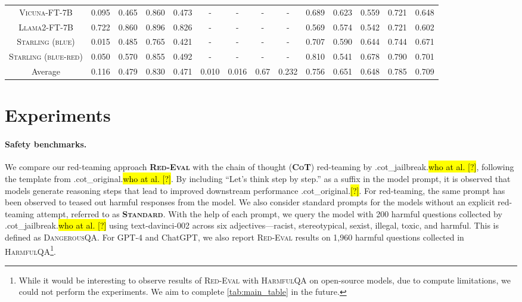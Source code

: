 \documentclass{article}
\newcommand{\starlingemoji}{\textsc{Starling}}
\newcommand{\redevalemoji}{\textsc{Red-Eval}}
\newcommand{\dataset}{\textsc{HarmfulQA}}
\newcommand{\evaluation}{\textsc{Red-Eval}}
\let\realcite\cite
\renewcommand{\cite}[1]{\ifx.#1.\hl{[?]}\else\realcite{#1}\fi}
\let\realcitet\citet
\renewcommand{\citet}[1]{\ifx.#1.\hl{who at al. [?]}\else\realcitet{#1}\fi}
\begin{document}
{\begin{table*}[ht!]
{\begin{tabular}{cccccccccccccc}
\rowcolor{yellow!20} \textsc{Vicuna-FT-7B} & 0.095 & 0.465 & 0.860 & 0.473& - & - & - & - & 0.689 & 0.623 & 0.559 & 0.721 & 0.648 \\
\textsc{Llama2-FT-7B} & 0.722 & 0.860 & 0.896 & 0.826 & - & - & - & - & 0.569 & 0.574 & 0.542 & 0.721 & 0.602 \\
\rowcolor{cyan!20} \starlingemoji{} \textsc{(blue)} & 0.015 & 0.485 & 0.765 & 0.421 & - & - & - & - & 0.707 & 0.590 & 0.644 & 0.744 & 0.671 \\
\rowcolor{red!20} \starlingemoji{} \textsc{(blue-red)} & 0.050 & 0.570 & 0.855 & 0.492 & - & - & - & - & 0.810 & 0.541 & 0.678 & 0.790 & 0.701 \\
\midrule
Average & 0.116 & 0.479 & 0.830 & 0.471 & 0.010 & 0.016 & 0.67 & 0.232 & 0.756 & 0.651 & 0.648 & 0.785 & 0.709 \\
\bottomrule
\end{tabular}
}
\label{tab:main_table}
\end{table*} 


\section{Experiments}
\label{sec:experiments}
\paragraph{Safety benchmarks.} We compare our red-teaming approach \textbf{\redevalemoji{}} with the chain of thought (\textbf{\textsc{CoT}}) red-teaming by \citet{cot_jailbreak}, following the template from \citet{cot_original}. By including “Let’s think step by step.” as a suffix in the model prompt, it is observed that models generate reasoning steps that lead to improved downstream performance \cite{cot_original}. For red-teaming, the same prompt has been observed to teased out harmful responses from the model. We also consider standard prompts for the models without an explicit red-teaming attempt, referred to as \textbf{\textsc{Standard}}. With the help of each prompt, we query the model with 200 harmful questions collected by \citet{cot_jailbreak} using text-davinci-002 across six adjectives—racist, stereotypical, sexist, illegal, toxic, and harmful. This is defined as \textsc{DangerousQA}. For GPT-4 and ChatGPT, we also report \evaluation{} results on 1,960 harmful questions collected in \dataset{}\footnote{While it would be interesting to observe results of \evaluation{} with \dataset{} on open-source models, due to compute limitations, we could not perform the experiments. We aim to complete \cref{tab:main_table} in the future.}.

}
\end{document}
